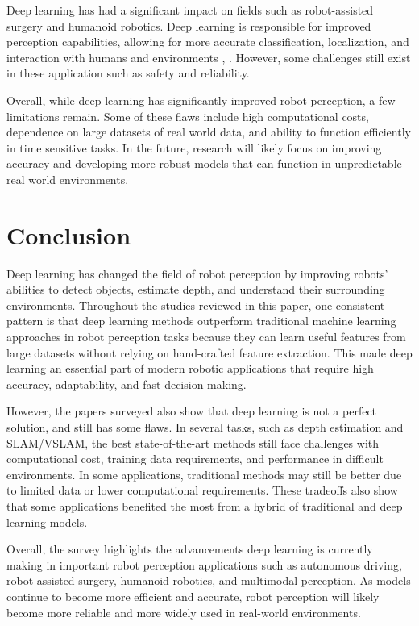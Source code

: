 \documentclass[conference]{IEEEtran}
\begin{document}
\par
Deep learning has had a significant impact on fields such as robot-assisted surgery and humanoid robotics. Deep learning is responsible for improved perception capabilities, allowing for more accurate classification, localization, and interaction with humans and environments \cite{hussain2022}, \cite{roychoudhury2023}. However, some challenges still exist in these application such as safety and reliability.
\par
Overall, while deep learning has significantly improved robot perception, a few limitations remain. Some of these flaws include high computational costs, dependence on large datasets of real world data, and ability to function efficiently in time sensitive tasks. In the future, research will likely focus on improving accuracy and developing more robust models that can function in unpredictable real world environments.

\section{Conclusion}
Deep learning has changed the field of robot perception by improving robots' abilities to detect objects, estimate depth, and understand their surrounding environments. Throughout the studies reviewed in this paper, one consistent pattern is that deep learning methods outperform traditional machine learning approaches in robot perception tasks because they can learn useful features from large datasets without relying on hand-crafted feature extraction. This made deep learning an essential part of modern robotic applications that require high accuracy, adaptability, and fast decision making.
\par
However, the papers surveyed also show that deep learning is not a perfect solution, and still has some flaws. In several tasks, such as depth estimation and SLAM/VSLAM, the best state-of-the-art methods still face challenges with computational cost, training data requirements, and performance in difficult environments. In some applications, traditional methods may still be better due to limited data or lower computational requirements. These tradeoffs also show that some applications benefited the most from a hybrid of traditional and deep learning models.
\par
Overall, the survey highlights the advancements deep learning is currently making in important robot perception applications such as autonomous driving, robot-assisted surgery, humanoid robotics, and multimodal perception. As models continue to become more efficient and accurate, robot perception will likely become more reliable and more widely used in real-world environments. 
\end{document}
